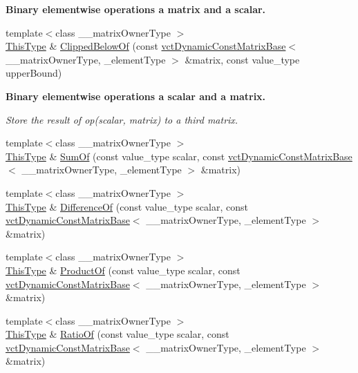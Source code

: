 \begin{Indent}{\bf Binary elementwise operations a matrix and a scalar.}
\begin{DoxyCompactItemize}
\item 
{\footnotesize template$<$class \-\_\-\-\_\-matrix\-Owner\-Type $>$ }\\\hyperlink{classvct_dynamic_const_matrix_base_ac4ff48cbe4d9de3fdef5a02447ffb9db}{This\-Type} \& \hyperlink{classvct_dynamic_matrix_base_ab9967c2bd33fe260b623dca4e998bb93}{Clipped\-Below\-Of} (const \hyperlink{classvct_dynamic_const_matrix_base}{vct\-Dynamic\-Const\-Matrix\-Base}$<$ \-\_\-\-\_\-matrix\-Owner\-Type, \-\_\-element\-Type $>$ \&matrix, const value\-\_\-type upper\-Bound)
\end{DoxyCompactItemize}
\end{Indent}
\begin{Indent}{\bf Binary elementwise operations a scalar and a matrix.}\par
{\em Store the result of op(scalar, matrix) to a third matrix. }\begin{DoxyCompactItemize}
\item 
{\footnotesize template$<$class \-\_\-\-\_\-matrix\-Owner\-Type $>$ }\\\hyperlink{classvct_dynamic_const_matrix_base_ac4ff48cbe4d9de3fdef5a02447ffb9db}{This\-Type} \& \hyperlink{classvct_dynamic_matrix_base_a9154f743f4d0671b93b7b09a9ce954be}{Sum\-Of} (const value\-\_\-type scalar, const \hyperlink{classvct_dynamic_const_matrix_base}{vct\-Dynamic\-Const\-Matrix\-Base}$<$ \-\_\-\-\_\-matrix\-Owner\-Type, \-\_\-element\-Type $>$ \&matrix)
\item 
{\footnotesize template$<$class \-\_\-\-\_\-matrix\-Owner\-Type $>$ }\\\hyperlink{classvct_dynamic_const_matrix_base_ac4ff48cbe4d9de3fdef5a02447ffb9db}{This\-Type} \& \hyperlink{classvct_dynamic_matrix_base_ab29865a31b49f75c51fc9dc275d09f15}{Difference\-Of} (const value\-\_\-type scalar, const \hyperlink{classvct_dynamic_const_matrix_base}{vct\-Dynamic\-Const\-Matrix\-Base}$<$ \-\_\-\-\_\-matrix\-Owner\-Type, \-\_\-element\-Type $>$ \&matrix)
\item 
{\footnotesize template$<$class \-\_\-\-\_\-matrix\-Owner\-Type $>$ }\\\hyperlink{classvct_dynamic_const_matrix_base_ac4ff48cbe4d9de3fdef5a02447ffb9db}{This\-Type} \& \hyperlink{classvct_dynamic_matrix_base_ada447fa096c78c038d70f0d1c445132a}{Product\-Of} (const value\-\_\-type scalar, const \hyperlink{classvct_dynamic_const_matrix_base}{vct\-Dynamic\-Const\-Matrix\-Base}$<$ \-\_\-\-\_\-matrix\-Owner\-Type, \-\_\-element\-Type $>$ \&matrix)
\item 
{\footnotesize template$<$class \-\_\-\-\_\-matrix\-Owner\-Type $>$ }\\\hyperlink{classvct_dynamic_const_matrix_base_ac4ff48cbe4d9de3fdef5a02447ffb9db}{This\-Type} \& \hyperlink{classvct_dynamic_matrix_base_a6b70c2d49a8bac26bd54792f849bab5a}{Ratio\-Of} (const value\-\_\-type scalar, const \hyperlink{classvct_dynamic_const_matrix_base}{vct\-Dynamic\-Const\-Matrix\-Base}$<$ \-\_\-\-\_\-matrix\-Owner\-Type, \-\_\-element\-Type $>$ \&matrix)

\end{DoxyCompactItemize}
\end{Indent}
